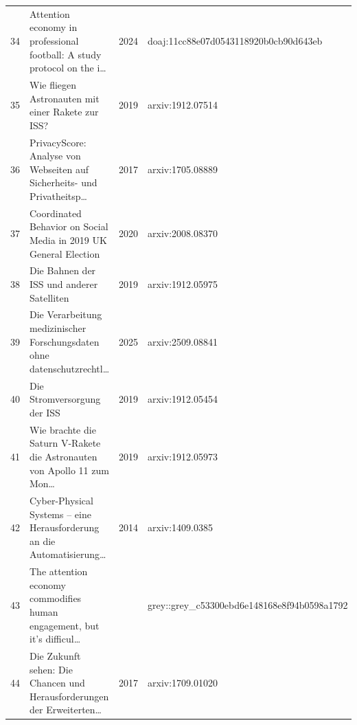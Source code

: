 \documentclass[11pt,a4paper]{article}
\begin{document}
\begin{longtable}{r p{} c p{}}
34 & Attention economy in professional football: A study protocol on the i… & 2024 & doaj:11cc88e07d0543118920b0cb90d643eb \\
35 & Wie fliegen Astronauten mit einer Rakete zur ISS? & 2019 & arxiv:1912.07514 \\
36 & PrivacyScore: Analyse von Webseiten auf Sicherheits- und Privatheitsp… & 2017 & arxiv:1705.08889 \\
37 & Coordinated Behavior on Social Media in 2019 UK General Election & 2020 & arxiv:2008.08370 \\
38 & Die Bahnen der ISS und anderer Satelliten & 2019 & arxiv:1912.05975 \\
39 & Die Verarbeitung medizinischer Forschungsdaten ohne datenschutzrechtl… & 2025 & arxiv:2509.08841 \\
40 & Die Stromversorgung der ISS & 2019 & arxiv:1912.05454 \\
41 & Wie brachte die Saturn V-Rakete die Astronauten von Apollo 11 zum Mon… & 2019 & arxiv:1912.05973 \\
42 & Cyber-Physical Systems -- eine Herausforderung an die Automatisierung… & 2014 & arxiv:1409.0385 \\
43 & The attention economy commodifies human engagement, but it’s difficul… &  & grey::grey\_c53300ebd6e148168e8f94b0598a1792 \\
44 & Die Zukunft sehen: Die Chancen und Herausforderungen der Erweiterten… & 2017 & arxiv:1709.01020 \\
\bottomrule
\end{longtable}
\printbibliography[title={Quellenverzeichnis}]
\end{document}
